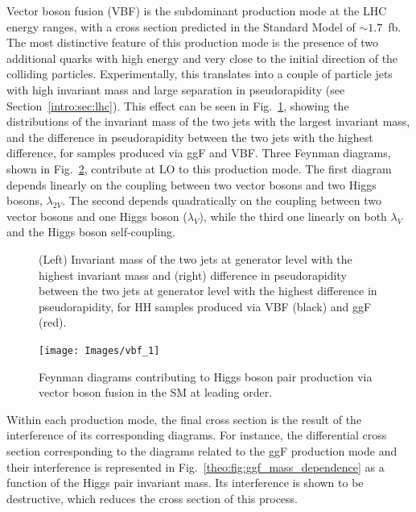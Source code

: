 \documentclass[../main.tex]{subfiles}
\begin{document}
Vector boson fusion (VBF) is the subdominant production mode at the LHC energy ranges, with a cross section predicted in the Standard Model of $\sim1.7$~fb. The most distinctive feature of this production mode is the presence of two additional quarks with high energy and very close to the initial direction of the colliding particles. Experimentally, this translates into a couple of particle jets with high invariant mass and large separation in pseudorapidity (see Section~\ref{intro:sec:lhc}). This effect can be seen in Fig.~\ref{theo:fig:genjj}, showing the distributions of the invariant mass of the two jets with the largest invariant mass, and the difference in pseudorapidity between the two jets with the highest difference, for samples produced via ggF and VBF. Three Feynman diagrams, shown in Fig.~\ref{theo:fig:vbf_feynman}, contribute at LO to this production mode. The first diagram depends linearly on the coupling between two vector bosons and two Higgs bosons, $\lambda_{2V}$. The second depends quadratically on the coupling between two vector bosons and one Higgs boson ($\lambda_{V}$), while the third one linearly on both $\lambda_{V}$ and the Higgs boson self-coupling.

\begin{figure}[h!]
\begin{center}
\end{center}
\caption[Jet-jet invariant mass and difference in pseudorapidity]{(Left) Invariant mass of the two jets at generator level with the highest invariant mass and (right) difference in pseudorapidity between the two jets at generator level with the highest difference in pseudorapidity, for HH samples produced via VBF (black) and ggF (red).}
\label{theo:fig:genjj}
\end{figure}

\begin{figure}[h!]
\begin{center}
\texttt{[image: Images/vbf\_1]}
\end{center}
\caption[HH vector boson fusion diagrams]{Feynman diagrams contributing to Higgs boson pair production via vector boson fusion in the SM at leading order.}
\label{theo:fig:vbf_feynman}
\end{figure}

Within each production mode, the final cross section is the result of the interference of its corresponding diagrams. For instance, the differential cross section corresponding to the diagrams related to the ggF production mode and their interference is represented in Fig.~\ref{theo:fig:ggf_mass_dependence} as a function of the Higgs pair invariant mass. Its interference is shown to be destructive, which reduces the cross section of this process.
\end{document}
